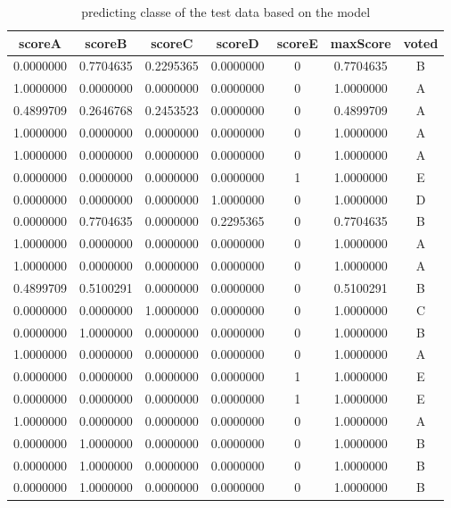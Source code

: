 \documentclass[]{article}
\begin{document}
\begin{table}[t]

\caption{\label{tab:apply_on_test_data}predicting classe of the test data based on the model}
\centering
\begin{tabular}{c|c|c|c|c|c|c}
\hline
scoreA & scoreB & scoreC & scoreD & scoreE & maxScore & voted\\
\hline
0.0000000 & 0.7704635 & 0.2295365 & 0.0000000 & 0 & 0.7704635 & B\\
\hline
1.0000000 & 0.0000000 & 0.0000000 & 0.0000000 & 0 & 1.0000000 & A\\
\hline
0.4899709 & 0.2646768 & 0.2453523 & 0.0000000 & 0 & 0.4899709 & A\\
\hline
1.0000000 & 0.0000000 & 0.0000000 & 0.0000000 & 0 & 1.0000000 & A\\
\hline
1.0000000 & 0.0000000 & 0.0000000 & 0.0000000 & 0 & 1.0000000 & A\\
\hline
0.0000000 & 0.0000000 & 0.0000000 & 0.0000000 & 1 & 1.0000000 & E\\
\hline
0.0000000 & 0.0000000 & 0.0000000 & 1.0000000 & 0 & 1.0000000 & D\\
\hline
0.0000000 & 0.7704635 & 0.0000000 & 0.2295365 & 0 & 0.7704635 & B\\
\hline
1.0000000 & 0.0000000 & 0.0000000 & 0.0000000 & 0 & 1.0000000 & A\\
\hline
1.0000000 & 0.0000000 & 0.0000000 & 0.0000000 & 0 & 1.0000000 & A\\
\hline
0.4899709 & 0.5100291 & 0.0000000 & 0.0000000 & 0 & 0.5100291 & B\\
\hline
0.0000000 & 0.0000000 & 1.0000000 & 0.0000000 & 0 & 1.0000000 & C\\
\hline
0.0000000 & 1.0000000 & 0.0000000 & 0.0000000 & 0 & 1.0000000 & B\\
\hline
1.0000000 & 0.0000000 & 0.0000000 & 0.0000000 & 0 & 1.0000000 & A\\
\hline
0.0000000 & 0.0000000 & 0.0000000 & 0.0000000 & 1 & 1.0000000 & E\\
\hline
0.0000000 & 0.0000000 & 0.0000000 & 0.0000000 & 1 & 1.0000000 & E\\
\hline
1.0000000 & 0.0000000 & 0.0000000 & 0.0000000 & 0 & 1.0000000 & A\\
\hline
0.0000000 & 1.0000000 & 0.0000000 & 0.0000000 & 0 & 1.0000000 & B\\
\hline
0.0000000 & 1.0000000 & 0.0000000 & 0.0000000 & 0 & 1.0000000 & B\\
\hline
0.0000000 & 1.0000000 & 0.0000000 & 0.0000000 & 0 & 1.0000000 & B\\
\hline
\end{tabular}
\end{table}
\end{document}
